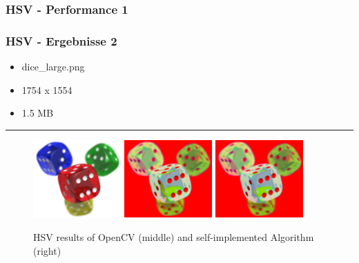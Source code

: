 \begin{frame}
    \frametitle{HSV - Performance 1}

    

\end{frame}

\begin{frame}
    \frametitle{HSV - Ergebnisse 2}

    \begin{itemize}
        \item dice\_large.png
        \item 1754 x 1554
        \item 1.5 MB
    \end{itemize}

    \hfill
    \hrule
    \hfill

    \begin{figure}[H]
        \centering
    
        \includegraphics[width=0.30\textwidth]{images/dice_large.png}
        \includegraphics[width=0.30\textwidth]{images/results/hsv-cv.dice_large.png}
        \includegraphics[width=0.30\textwidth]{images/results/hsv-my.dice_large.png}

        
        \begin{center}
            \caption{HSV results of OpenCV (middle) and self-implemented  Algorithm (right)}            
        \end{center}

        \label{fig:hsv2}
    \end{figure}
\end{frame}

